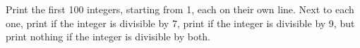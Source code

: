 \documentclass[answers,addpoints]{exam}
\begin{document}
\begin{questions}
\question[15] Print the first 100 integers, starting from 1, each on their own line. Next to each one, print  if the integer is divisible by 7, print  if the integer is divisible by 9, but print nothing if the integer is divisible by both.

\begin{solution}
\end{solution}

\end{questions}
\end{document}
